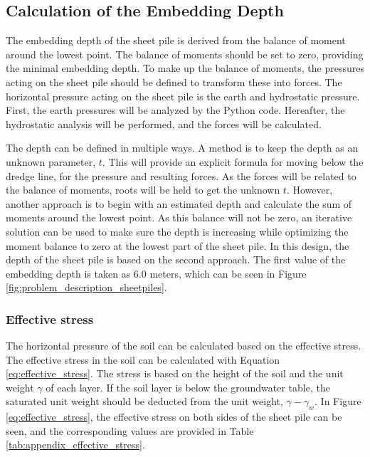 

\subsection{Calculation of the Embedding Depth}
\label{section:embedding_depth}

The embedding depth of the sheet pile is derived from the balance of moment around the lowest point. The balance of moments should be set to zero, providing the minimal embedding depth. To make up the balance of moments, the pressures acting on the sheet pile should be defined to transform these into forces. The horizontal pressure acting on the sheet pile is the earth and hydrostatic pressure. First, the earth pressures will be analyzed by the Python code. Hereafter, the hydrostatic analysis will be performed, and the forces will be calculated. 

The depth can be defined in multiple ways. A method is to keep the depth as an unknown parameter, $t$. This will provide an explicit formula for moving below the dredge line, for the pressure and resulting forces. As the forces will be related to the balance of moments, roots will be held to get the unknown $t$. However, another approach is to begin with an estimated depth and calculate the sum of moments around the lowest point. As this balance will not be zero, an iterative solution can be used to make sure the depth is increasing while optimizing the moment balance to zero at the lowest part of the sheet pile. In this design, the depth of the sheet pile is based on the second approach. The first value of the embedding depth is taken as $6.0$ meters, which can be seen in Figure \ref{fig:problem_description_sheetpiles}.

\newpage

\subsubsection{Effective stress}

The horizontal pressure of the soil can be calculated based on the effective stress. The effective stress in the soil can be calculated with Equation \ref{eq:effective_stress}. The stress is based on the height of the soil and the unit weight $\gamma$ of each layer. If the soil layer is below the groundwater table, the saturated unit weight should be deducted from the unit weight, $\gamma - \gamma_{w}$. In Figure \ref{eq:effective_stress}, the effective stress on both sides of the sheet pile can be seen, and the corresponding values are provided in Table \ref{tab:appendix_effective_stress}.


